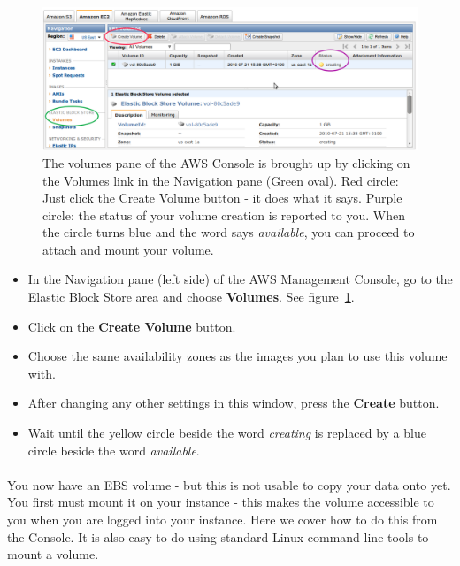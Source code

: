 \begin{figure}[!hd]
	\fbox
	{
		\begin{minipage}{13cm}
\includegraphics[width=\maxwidth]{"images/createVolume-1"}
\caption[Create volume in console]{\label{fig:createvolume}The volumes pane of the AWS Console is brought up by clicking on the Volumes link in the Navigation pane (Green oval).  Red circle: Just click the Create Volume button - it does what it says. Purple circle: the status of your volume creation is reported to you. When the circle turns blue and the word says \emph{available}, you can proceed to attach and mount your volume.}
		\end{minipage}
	}
\end{figure}

\begin{itemize}
\item In the Navigation pane (left side) of the AWS Management Console, go to the Elastic Block Store area and choose \textbf{Volumes}. See figure~\ref{fig:createvolume}.
\item Click on the \textbf{Create Volume} button.
\item Choose the same availability zones as the images you plan to use this volume with.
\item After changing any other settings in this window, press the \textbf{Create} button.
\item Wait until the yellow circle beside the word \emph{creating} is replaced by a blue circle beside the word \emph{available}.
\end{itemize}

\paragraph{}You now have an EBS volume - but this is not usable to copy your data onto yet. You first must mount it on your instance - this makes the volume accessible to you when you are logged into your instance. Here we cover how to do this from the Console. It is also easy to do using standard Linux command line tools to mount a volume.

